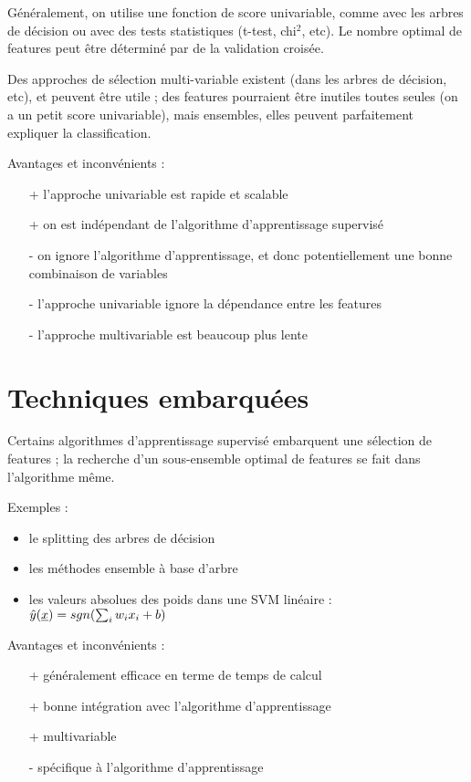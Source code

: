 	Généralement, on utilise une fonction de score univariable, comme avec les arbres de décision ou avec des tests statistiques (t-test, chi$^2$, etc). Le nombre optimal de features peut être déterminé par de la validation croisée.
	
	Des approches de sélection multi-variable existent (dans les arbres de décision, etc), et peuvent être utile ; des features pourraient être inutiles toutes seules (on a un petit score univariable), mais ensembles, elles peuvent parfaitement expliquer la classification.
	
	
	Avantages et inconvénients :
	\begin{itemize}
		\item[+] l'approche univariable est rapide et scalable
		\item[+] on est indépendant de l'algorithme d'apprentissage supervisé
		\item[-] on ignore l'algorithme d'apprentissage, et donc potentiellement une bonne combinaison de variables
		\item[-] l'approche univariable ignore la dépendance entre les features
		\item[-] l'approche multivariable est beaucoup plus lente
	\end{itemize}
	
\section{Techniques embarquées}

Certains algorithmes d'apprentissage supervisé embarquent une sélection de features ; la recherche d'un sous-ensemble optimal de features se fait dans l'algorithme même.

Exemples :

\begin{itemize}
	\item le splitting des arbres de décision
	\item les méthodes ensemble à base d'arbre
	\item les valeurs absolues des poids dans une SVM linéaire : $\hat{y}(\underline{x}) = sgn(\sum_i w_i x_i + b)$
\end{itemize}

Avantages et inconvénients :
	
\begin{itemize}
	\item[+] généralement efficace en terme de temps de calcul
	\item[+] bonne intégration avec l'algorithme d'apprentissage
	\item[+] multivariable
	\item[-] spécifique à l'algorithme d'apprentissage
\end{itemize}

